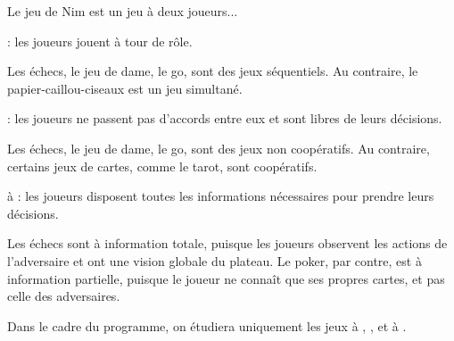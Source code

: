 \documentclass[12pt,fancy]{cours}
\begin{document}
%
%

Le jeu de Nim est un jeu à deux joueurs...
\begin{liste}
  \item {} : les joueurs jouent à tour de rôle.
  
  \begin{remarque}
  Les échecs, le jeu de dame, le go, sont des jeux séquentiels. Au contraire, le papier-caillou-ciseaux est un jeu simultané.
  \end{remarque}
  
\item {} : les joueurs ne passent pas d'accords entre eux et sont libres de leurs décisions.

\begin{remarque}
Les échecs, le jeu de dame, le go, sont des jeux non coopératifs. Au contraire, certains jeux de cartes, comme le tarot, sont coopératifs.
\end{remarque}

\item à  : les joueurs disposent toutes les informations nécessaires pour prendre leurs décisions.

\begin{remarque}
Les échecs sont à information totale, puisque les joueurs observent les actions de l'adversaire et ont une vision globale du plateau. Le poker, par contre, est à information partielle, puisque le joueur ne connaît que ses propres cartes, et pas celle des adversaires.
\end{remarque}


\end{liste}
Dans le cadre du programme, on étudiera uniquement les jeux à , ,  et à .
\end{document}
